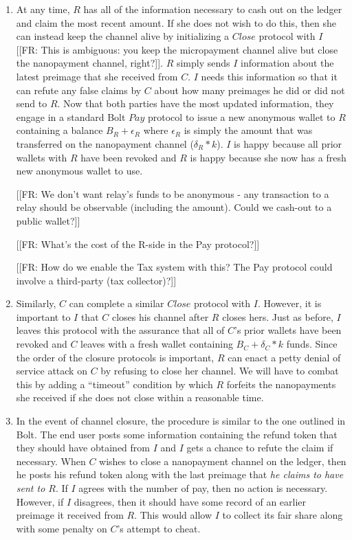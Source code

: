 \documentclass{article}
\newcommand{\flo}[1]{ {\color{red} [[FR: #1]]}}
\begin{document}
\begin{enumerate}
\item At any time, $R$ has all of the information necessary to cash out on the ledger and claim the most recent amount. If she does not wish to do this, then she can instead keep the channel alive by initializing a $Close$ protocol with $I$ \flo{This is ambiguous: you keep the micropayment channel alive but close the nanopayment channel, right?}. $R$ simply sends $I$ information about the latest preimage that she received from $C$. $I$ needs this information so that it can refute any false claims by $C$ about how many preimages he did or did not send to $R$. Now that both parties have the most updated information, they engage in a standard Bolt $Pay$ protocol to issue a new anonymous wallet to $R$ containing a balance $B_R + \epsilon_R$ where $\epsilon_R$ is simply the amount that was transferred on the nanopayment channel ($\delta_R * k$). $I$ is happy because all prior wallets with $R$ have been revoked and $R$ is happy because she now has a fresh new anonymous wallet to use.

\flo{We don't want relay's funds to be anonymous - any transaction to a relay should be observable (including the amount). Could we cash-out to a public wallet?}

\flo{What's the cost of the R-side in the Pay protocol?}

\flo{How do we enable the Tax system with this? The Pay protocol could involve a third-party (tax collector)?}

\item Similarly, $C$ can complete a similar $Close$ protocol with $I$. However, it is important to $I$ that $C$ closes his channel after $R$ closes hers. Just as before, $I$ leaves this protocol with the assurance that all of $C$'s prior wallets have been revoked and $C$ leaves with a fresh wallet containing $B_C + \delta_C * k$ funds. Since the order of the closure protocols is important, $R$ can enact a petty denial of service attack on $C$ by refusing to close her channel. We will have to combat this by adding a ``timeout'' condition by which $R$ forfeits the nanopayments she received if she does not close within a reasonable time.

\item In the event of channel closure, the procedure is similar to the one outlined in Bolt. The end user posts some information containing the refund token that they should have obtained from $I$ and $I$ gets a chance to refute the claim if necessary. When $C$ wishes to close a nanopayment channel on the ledger, then he posts his refund token along with the last preimage that \emph{he claims to have sent to $R$}. If $I$ agrees with the number of pay, then no action is necessary. However, if $I$ disagrees, then it should have some record of an earlier preimage it received from $R$. This would allow $I$ to collect its fair share along with some penalty on $C$'s attempt to cheat.
\end{enumerate}
\end{document}
